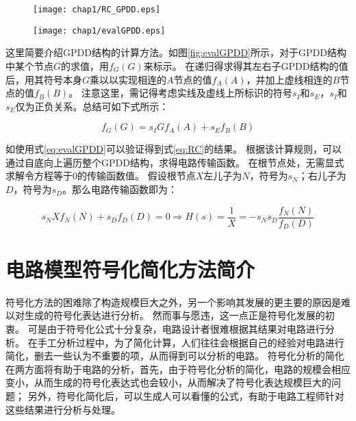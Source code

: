 \begin{exmp}
\begin{figure}[!htp]
	\centering
	\texttt{[image: chap1/RC\_GPDD.eps]}
\end{figure}

\begin{figure}[!htp]
	\centering
	\texttt{[image: chap1/evalGPDD.eps]}
\end{figure}

这里简要介绍GPDD结构的计算方法。如图\ref{fig:evalGPDD}所示，对于GPDD结构中某个节点$G$的求值，用$f_{G} \left( G \right)$来标示。
在递归得求得其左右子GPDD结构的值后，用其符号本身$G$乘以以实现相连的$A$节点的值$f_{A} \left( A \right)$，并加上虚线相连的$B$节点的值$f_{B} \left( B \right)$。
注意这里，需记得考虑实线及虚线上所标识的符号$s_I$和$s_E$，$s_I$和$s_E$仅为正负关系。总结可如下式所示：

\begin{equation}
\label{eq:evalGPDD}
f_{G} \left( G \right) = s_I G f_{A} \left( A \right) + s_E f_{B} \left( B \right)
\end{equation}

如使用式\ref{eq:evalGPDD}可以验证得到式\ref{eq:RC}的结果。
根据该计算规则，可以通过自底向上遍历整个GPDD结构，求得电路传输函数。
在根节点处，无需显式求解令方程等于0的传输函数值。
假设根节点$X$左儿子为$N$，符号为$s_N$；右儿子为$D$，符号为$s_D$。那么电路传输函数即为：

\begin{equation}
\label{eq:evalGPDDRoot}
s_N  X f_N\left(N\right) + s_D f_D\left(D\right) = 0 \Rightarrow H \left( s \right) = \frac{1}{X}= - s_N s_D \frac{f_N\left(N\right)}{f_D\left(D\right)}
\end{equation}

\end{exmp}

\section{电路模型符号化简化方法简介}
\label{sec:intro:simp}

符号化方法的困难除了构造规模巨大之外，另一个影响其发展的更主要的原因是难以对生成的符号化表达进行分析。
然而事与愿违，这一点正是符号化发展的初衷。
可是由于符号化公式十分复杂，电路设计者很难根据其结果对电路进行分析。
在手工分析过程中，为了简化计算，人们往往会根据自己的经验对电路进行简化，删去一些认为不重要的项，从而得到可以分析的电路。
符号化分析的简化在两方面将有助于电路的分析，首先，由于符号化分析的简化，电路的规模会相应变小，从而生成的符号化表达式也会较小，从而解决了符号化表达规模巨大的问题；
另外，符号化简化后，可以生成人可以看懂的公式，有助于电路工程师针对这些结果进行分析与处理。

